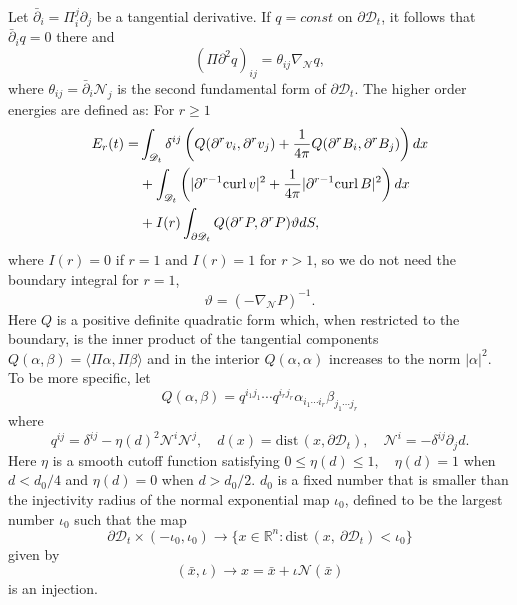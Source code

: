 \documentclass[12pt,reqno]{amsart}
\numberwithin{equation}{section}
\theoremstyle{definition}
\theoremstyle{remark}
\begin{document}
Let $\bar \partial_i=\Pi_i^j \partial_j$ be a tangential derivative. If $q=const$ on $\partial {{\mathscr{D}}}_t$, it follows that $\bar \partial_i q=0$ there and
\begin{equation}\label{esff1}
(\Pi \partial^2 q)_{ij}=\theta_{ij} \nabla_{\mathcal{N}} q,
\end{equation}
where ${\theta}_{ij}=\bar \partial_i {\mathcal{N}}_j$ is the second fundamental form of $\partial {{\mathscr{D}}}_t$.
The higher order energies are defined as:
For $r\ge 1$
\begin{align}\label{ereen}
E_r(t)=&\int_{{{\mathscr{D}}}_t}\delta^{ij}\left(Q({\partial}^r v_i, {\partial}^r v_j)+\frac{1}{4\pi}Q({\partial}^r B_i, {\partial}^r B_j)\right)dx\notag\\
       &+\int_{{{\mathscr{D}}}_t}\left(|{\partial}^{r-1}{\mathrm{curl}\,} v|^2+\frac{1}{4\pi}|{\partial}^{r-1}{\mathrm{curl}\,} B|^2\right)dx\notag\\
       &+I(r)\int_{{\partial}{{\mathscr{D}}}_t}Q({\partial}^r P, {\partial}^r P)\vartheta dS,
\end{align}
where  $I(r)=0$ if $r=1$ and $I(r)=1$ for $r>1$, so we do not need the boundary integral for $r=1$,
$$\vartheta=(-\nabla_{\mathcal{N}} P)^{-1}.$$
Here  $Q$ is a positive definite quadratic form which,
when restricted to the boundary, is the inner product of the tangential components $Q(\alpha, \beta)=\langle\Pi \alpha, \Pi \beta\rangle$  and in the interior $Q(\alpha, \alpha)$ increases to the norm $|\alpha|^2$. To be more specific, let
\begin{equation}\label{quadratic form}
Q(\alpha, \beta)=q^{i_1j_1}\cdots q^{i_rj_r}\alpha_{i_1\cdots i_r}\beta_{j_1\cdots j_r}
\end{equation}
where
\begin{equation}
q^{ij}=\delta^{ij}-\eta(d)^2{\mathcal{N}}^i{\mathcal{N}}^j, \quad d(x)={\mathrm{dist}\,}(x, {\partial}{{\mathscr{D}}}_t), \quad {\mathcal{N}}^i=-\delta^{ij}{\partial}_j d. \end{equation}
Here  $\eta$ is a smooth cutoff function satisfying $0{\leqslant} \eta(d){\leqslant} 1, \quad \eta(d)= 1$ when
$d < d_0/4$ and $\eta(d)=0$ when $d > d_0/2. $ $d_0$  is a fixed number that is smaller than
the injectivity radius of the normal exponential map $\iota_0$, defined to be the largest
number $\iota_0$ such that the map
\begin{equation}
 {\partial}{{\mathscr{D}}}_t\times (-\iota_0, \iota_0)\to \{x\in {\mathbb R}^n:  {\mathrm{dist}\,}(x,\  {\partial}{{\mathscr{D}}}_t) < \iota_0\}\end{equation}
 given by
$$(\bar x, \iota)\to x=\bar x+\iota {\mathcal{N}}(\bar x)$$
is an injection.
\end{document}
